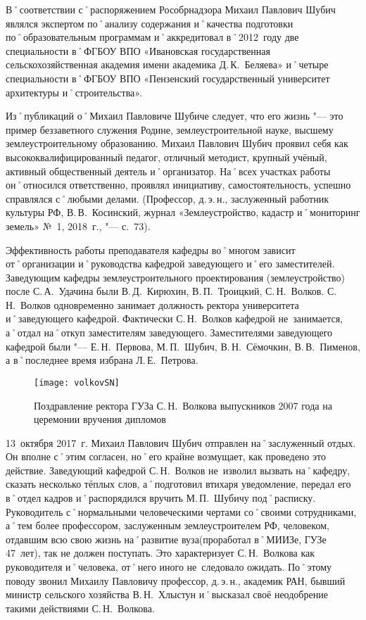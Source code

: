 В˚соответствии с˚распоряжением Рособрнадзора Михаил Павлович Шубич являлся экспертом по˚анализу содержания и˚качества подготовки по˚образовательным программам и˚аккредитовал в˚2012~году две специальности в˚ФГБОУ ВПО «Ивановская государственная сельскохозяйственная академия имени академика Д.\,К.~Беляева» и˚четыре специальности в˚ФГБОУ ВПО «Пензенский государственный университет архитектуры и˚строительства». 

Из˚публикаций о˚Михаил Павловиче Шубиче следует, что его жизнь "--- это пример беззаветного служения Родине, землеустроительной науке, высшему землеустроительному образованию. Михаил Павлович Шубич проявил себя как высококвалифицированный педагог, отличный методист, крупный учёный, активный общественный деятель и˚организатор. На˚всех участках работы он˚относился ответственно, проявлял инициативу, самостоятельность, успешно справлялся с˚любыми делами. (Профессор, д.\,э.\,н., заслуженный работник культуры РФ, В.\,В.~Косинский, журнал «Землеустройство, кадастр и˚мониторинг земель» №~1, 2018~г., "--- с.~73). 

Эффективность работы преподавателя кафедры во˚многом зависит от˚организации и˚руководства кафедрой заведующего и˚его заместителей. Заведующим кафедры землеустроительного проектирования (землеустройство) после С.\,А.~Удачина были В.\,Д.~Кирюхин, В.\,П.~Троицкий, С.\,Н.~Волков. С.\,Н.~Волков одновременно занимает должность ректора университета и˚заведующего кафедрой. Фактически С.\,Н.~Волков кафедрой не~занимается, а˚отдал на˚откуп заместителям заведующего. Заместителями заведующего кафедрой были "---  Е.\,Н.~Первова, М.\,П.~Шубич, В.\,Н.~Сёмочкин, В.\,В.~Пименов, а в˚последнее время избрана Л.\,Е.~Петрова.

\begin{wrapfigure}{O}{.4\textwidth}
\centering
\texttt{[image: volkovSN]}
\caption[Поздравление ректора ГУЗа С.\,Н.~Волкова выпускников 2007 года на церемонии вручения дипломов]{Поздравление ректора ГУЗа С.\,Н.~Волкова выпускников 2007 года на церемонии вручения дипломов\footnotemark}
\label{fig:volkovSN}
\end{wrapfigure}

13~октября 2017~г. Михаил Павлович Шубич отправлен на˚заслуженный отдых. Он вполне с˚этим согласен, но˚его крайне возмущает, как проведено это действие. Заведующий кафедрой С.\,Н.~Волков не~изволил вызвать на˚кафедру, сказать несколько тёплых слов, а˚подготовил втихаря уведомление, передал его в˚отдел кадров и˚распорядился вручить М.\,П.~Шубичу под˚расписку. Руководитель с˚нормальными человеческими чертами со˚своими сотрудниками, а˚тем более профессором, заслуженным землеустроителем РФ, человеком, отдавшим всю свою жизнь на˚развитие вуза(проработал в˚МИИЗе, ГУЗе 47~лет), так не должен поступать. Это характеризует С.\,Н.~Волкова как руководителя и˚человека, от˚него иного не~следовало ожидать. По˚этому поводу звонил Михаилу Павловичу профессор, д.\,э.\,н., академик РАН, бывший министр сельского хозяйства В.\,Н.~Хлыстун и˚высказал своё неодобрение такими действиями С.\,Н.~Волкова.

